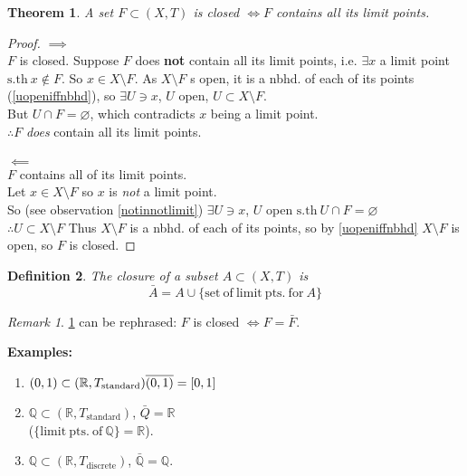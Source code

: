 \documentclass{article}
\newcommand{\sth}{\mathrm{s.th}\ }
\newcommand{\R}{\mathbb{R}}
\newcommand{\Q}{\mathbb{Q}}
\renewcommand{\emptyset}{\varnothing}
\newtheorem{stheorem}{Theorem}[theorem]
\newtheorem{sdefinition}[stheorem]{Definition}
\theoremstyle{remark}
\theoremstyle{example}
\theoremstyle{examples}
\newtheorem*{remark}{Remark}
\begin{document}
	\begin{stheorem}
		\label{closediffcontainsalllimitpts}
		A set $F \subset(X,T)$ is closed $\iff F$ contains all its limit points.
	\end{stheorem}
	\begin{proof}
		$\implies$\\
		$F$ is closed. Suppose $F$ does \textbf{not} contain all its limit points, i.e. $\exists x$ a limit point $\sth x \notin F$. So $x \in X \setminus F$. As $X \setminus F$ s open, it is a nbhd. of each of its points (\ref{uopeniffnbhd}), so $\exists U \ni x$, $U$ open, $U \subset X \setminus F$.\\
		But $U \cap F = \emptyset$, which contradicts $x$ being a limit point.\\
		$\therefore F$ \textit{does} contain all its limit points.\\
		\\
		$\impliedby$\\
		$F$ contains all of its limit points.\\
		Let $x \in X \setminus F$ so $x$ is \textit{not} a limit point.\\
		So (see observation \ref{notinnotlimit}) $\exists U \ni x$, $U$ open $\sth U \cap F = \emptyset$\\
		$\therefore U \subset X \setminus F$ Thus $X \setminus F$ is a nbhd. of each of its points, so by \ref{uopeniffnbhd} $X \setminus F$ is open, so $F$ is closed.
	\end{proof}

	\begin{sdefinition}
		The \textit{closure} of a subset $A \subset (X,T)$ is \[\bar{A} = A \cup \{\mathrm{set\ of\ limit\ pts.\ for\ } A\}\]
	\end{sdefinition}

	\begin{remark}
		\ref{closediffcontainsalllimitpts} can be rephrased: $F$ is closed $\iff F = \bar{F}$.
	\end{remark}

	\textbf{Examples:}
	\begin{enumerate}
		\item $(0,1) \subset(\R,T_\mathrm{standard})\\
		\overline{(0,1)} = [0,1]$
		\item $\Q \subset (\R,T_\mathrm{standard})$, $\bar{Q} = \R$\\
		($\{\mathrm{limit\ pts.\ of\ } \Q\} =\R$).
		\item $\Q \subset(\R,T_\mathrm{discrete})$, $\bar{\Q}=\Q$.
	\end{enumerate}
\end{document}
